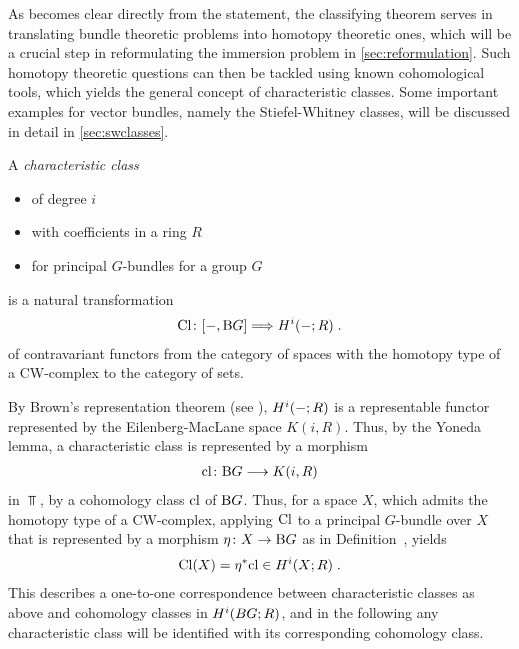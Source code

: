 As becomes clear directly from the statement, the classifying
theorem serves in translating bundle theoretic problems into homotopy
theoretic ones, which will be a crucial step in reformulating the
immersion problem in \autoref{sec:reformulation}.
Such homotopy theoretic questions can then be tackled using known
cohomological tools, which yields the general concept of
characteristic classes.
Some important examples for vector bundles, namely the
Stiefel-Whitney classes, will be discussed in detail in
\autoref{sec:swclasses}.
\begin{Def}
  A \emph{characteristic class}
  \begin{itemize}
  \item of degree $i$
  \item with coefficients in a ring $R$
  \item for principal $G$-bundles for a group $G$
  \end{itemize}
  is a natural transformation
  \begin{gather*}
    \mathrm{Cl}\colon [-, \mathrm{B}G] \Longrightarrow H^i(-; R)\;.
  \end{gather*}
  of contravariant functors from the category of spaces with the
  homotopy type of a CW-complex to the category of sets.
\end{Def}
\begin{Rem}
  By Brown's representation theorem
  (see \forexample \cite[Chap.~4.E]{hatcher}),
  $H^i(-;R)$ is a representable functor represented by the
  Eilenberg-MacLane space $K(i,R)$.
  Thus, by the Yoneda lemma, a characteristic class is
  represented by a morphism
  \begin{gather*}
    \mathrm{cl}\colon \mathrm{B}G \longrightarrow K(i, R)
  \end{gather*}
  in $\Top$, \idest by a cohomology class $\mathrm{cl}$ of $\mathrm{B}G$.
  Thus, for a space $X$, which admits the homotopy type of a
  CW-complex, 
  applying $\mathrm{Cl}$ to a principal $G$-bundle over $X$ that is
  represented by a morphism $\eta\colon X\to\mathrm{B}G$
  as in Definition~,
  yields
  \begin{gather*}
    \mathrm{Cl}(X) = {\eta}^* \mathrm{cl} \in H^i(X;R)
    \;.
  \end{gather*}
  This describes a one-to-one correspondence between
  characteristic classes as above and cohomology classes in
  $H^i(BG;R)$, and in the following any characteristic class will be
  identified with its corresponding cohomology class.
\end{Rem}

